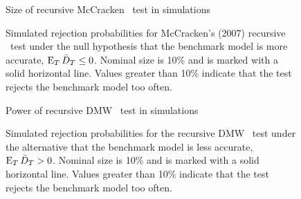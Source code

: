 \documentclass[12pt]{article}
\begin{document}
\begin{figure}\centering
  {\large Size of recursive McCracken \oost\ test in simulations}
  
  \caption{Simulated rejection probabilities for McCracken's (2007)
    recursive \oost\ test under the null hypothesis that the benchmark
    model is more accurate, $\operatorname{E}_T \bar{D}_{T} \leq 0$. Nominal size is 10\%
    and is marked with a solid horizontal line. Values greater than
    10\% indicate that the test rejects the benchmark model too
    often.}
  \label{fig:mccracken}
\end{figure}

\begin{figure}\centering
  {\large Power of recursive DMW \oost\ test in simulations}
  
  \caption{Simulated rejection probabilities for the recursive DMW
    \oost\ test under the alternative that the benchmark model is less
    accurate, $\operatorname{E}_T \bar{D}_{T} > 0$. Nominal size is 10\% and is marked
    with a solid horizontal line. Values greater than 10\% indicate
    that the test rejects the benchmark model too often.}
  \label{fig:ttest-power}
\end{figure}
\end{document}
